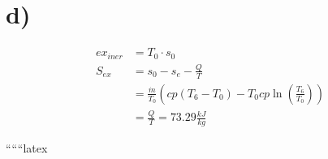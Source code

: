 

\section*{d)}

\begin{align*}
ex_{iner} &= T_0 \cdot s_0 \\
S_{ex} &= s_0 - s_e - \frac{Q}{T} \\
&= \frac{\dot{m}}{T_0} \left( cp \left( T_6 - T_0 \right) - T_0 cp \ln \left( \frac{T_6}{T_0} \right) \right) \\
&= \frac{Q}{T} = 73.29 \frac{kJ}{kg}
\end{align*}

``````latex